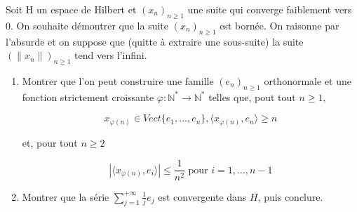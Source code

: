 \documentclass[10pt,a4paper,oneside]{article}
\newenvironment{exercice}[1][Exercice]{\begin{trivlist}
\item[\hskip \labelsep {\bfseries #1}]}{\end{trivlist}}
\begin{document}
\begin{exercice}

Soit H un espace de Hilbert et $(x_n)_{n\geq1}$ une suite qui converge faiblement vers 0. On souhaite démontrer que la suite $(x_n)_{n\geq1}$ est bornée. On raisonne par l'absurde et on suppose que (quitte à  extraire une sous-suite) la suite $(\|x_n\|)_{n\geq1}$ tend vers l'infini.

\begin{enumerate}

\item
Montrer que l'on peut construire une famille $(e_n)_{n\geq1}$ orthonormale et une fonction strictement croissante $\varphi : \mathbb{N}^* \rightarrow \mathbb{N}^*$ telles que, pout tout $n\geq1$,

\[
x_{\varphi(n)} \in Vect\{e_1,\ldots,e_n\}, \langle x_{\varphi(n)},e_n \rangle \geq n
\]

et, pour tout $n \geq 2$

\[
|\langle x_{\varphi(n)},e_i \rangle| \leq \frac{1}{n^2} \text{ pour } i = 1,\ldots,n-1
\]

\item Montrer que la série $\sum_{j = 1}^{+\infty} \frac{1}{j}e_j$ est convergente dans $H$, puis conclure.

\end{enumerate}

\end{exercice}
\end{document}
